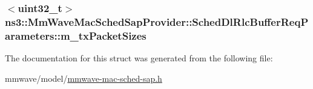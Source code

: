 \subsubsection[{\texorpdfstring{m\+\_\+tx\+Packet\+Sizes}{m_txPacketSizes}}]{$<$uint32\+\_\+t$>$ ns3\+::\+Mm\+Wave\+Mac\+Sched\+Sap\+Provider\+::\+Sched\+Dl\+Rlc\+Buffer\+Req\+Parameters\+::m\+\_\+tx\+Packet\+Sizes}\hypertarget{structns3_1_1MmWaveMacSchedSapProvider_1_1SchedDlRlcBufferReqParameters_a9ea7db0083310bd2b25d2ffdbf414623}{}\label{structns3_1_1MmWaveMacSchedSapProvider_1_1SchedDlRlcBufferReqParameters_a9ea7db0083310bd2b25d2ffdbf414623}


The documentation for this struct was generated from the following file\+:\begin{DoxyCompactItemize}
\item 
mmwave/model/\hyperlink{mmwave-mac-sched-sap_8h}{mmwave-\/mac-\/sched-\/sap.\+h}\end{DoxyCompactItemize}
